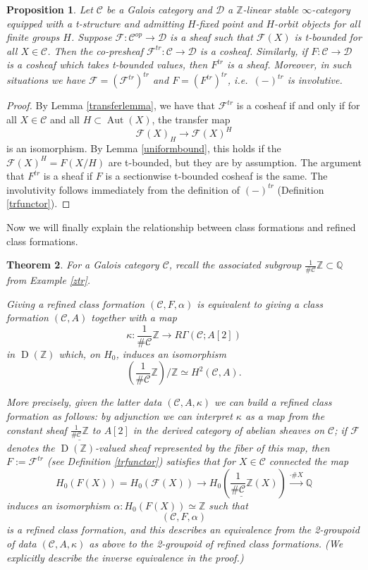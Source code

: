 \documentclass[12pt]{article}
\newtheorem{theorem}{Theorem}[section]
\newtheorem{proposition}[theorem]{Proposition}
\theoremstyle{definition}
\newcommand{\on}{\operatorname}
\newcommand{\mc}{\mathcal}
\newcommand{\mbb}{\mathbb}
\newcommand{\ul}{\underline}
\begin{document}
\begin{proposition}\label{trissheaf}
Let $\mc{C}$ be a Galois category and $\mc{D}$ a $\mbb{Z}$-linear stable $\infty$-category equipped with a t-structure and admitting $H$-fixed point and $H$-orbit objects for all finite groups $H$.  Suppose $\mc{F}:\mc{C}^{op}\to\mc{D}$ is a sheaf such that $\mc{F}(X)$ is t-bounded for all $X\in\mc{C}$.  Then the co-presheaf $\mc{F}^{tr}:\mc{C}\to\mc{D}$ is a cosheaf.  Similarly, if $F:\mc{C}\to\mc{D}$ is a cosheaf which takes t-bounded values, then $F^{tr}$ is a sheaf.  Moreover, in such situations we have $\mc{F}=(\mc{F}^{tr})^{tr}$ and $F=(F^{tr})^{tr}$, i.e.\ $(-)^{tr}$ is involutive.
\end{proposition}
\begin{proof}
By Lemma \ref{transferlemma}, we have that $\mc{F}^{tr}$ is a cosheaf if and only if for all $X\in\mc{C}$ and all $H\subset \on{Aut}(X)$, the transfer map
$$\mc{F}(X)_H\to \mc{F}(X)^H$$
is an isomorphism. By Lemma \ref{uniformbound}, this holds if the $\mc{F}(X)^H = F(X/H)$ are t-bounded, but they are by assumption.  The argument that $F^{tr}$ is a sheaf if $F$ is a sectionwise t-bounded cosheaf is the same.  The involutivity follows immediately from the definition of $(-)^{tr}$ (Definition \ref{trfunctor}).
\end{proof}

Now we will finally explain the relationship between class formations and refined class formations.

\begin{theorem}\label{cfvsrcf}
For a Galois category $\mc{C}$, recall the associated subgroup $\frac{1}{\#\mc{C}}\mbb{Z}\subset\mbb{Q}$ from Example \ref{ztr}.

Giving a refined class formation $(\mc{C},F,\alpha)$ is equivalent to giving a class formation $(\mc{C},A)$ together with a map
$$\kappa:\frac{1}{\#\mc{C}}\mbb{Z} \to R\Gamma(\mc{C};A[2])$$
in $\on{D}(\mbb{Z})$ which, on $H_0$, induces an isomorphism
$$\left(\frac{1}{\#\mc{C}}\mbb{Z}\right)/\mbb{Z}\simeq H^2(\mc{C},A).$$

More precisely, given the latter data $(\mc{C},A,\kappa)$ we can build a refined class formation as follows: by adjunction we can interpret $\kappa$ as a map from the constant sheaf $\ul{\frac{1}{\#\mc{C}}\mbb{Z}}$ to $A[2]$ in the derived category of abelian sheaves on $\mc{C}$; if $\mc{F}$ denotes the $\on{D}(\mbb{Z})$-valued sheaf represented by the fiber of this map, then $F:= \mc{F}^{tr}$ (see Definition \ref{trfunctor}) satisfies that for $X\in\mc{C}$ connected the map
$$H_0(F(X)) = H_0(\mc{F}(X)) \to H_0(\ul{\frac{1}{\#\mc{C}}\mbb{Z}}(X))\overset{\cdot \#X}{\rightarrow} \mbb{Q}$$
induces an isomorphism $\alpha: H_0(F(X))\simeq \mbb{Z}$ such that
$$(\mc{C},F,\alpha)$$
is a refined class formation, and this describes an equivalence from the 2-groupoid of data $(\mc{C},A,\kappa)$ as above to the 2-groupoid of refined class formations.  (We explicitly describe the inverse equivalence in the proof.)
\end{theorem}
\end{document}
